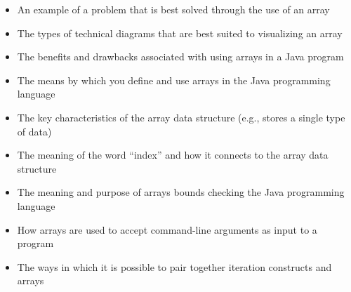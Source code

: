 \begin{itemize}

  \itemsep -.015in
  \item An example of a problem that is best solved through the use of an array
  \item The types of technical diagrams that are best suited to visualizing an array
  \item The benefits and drawbacks associated with using arrays in a Java program
  \item The means by which you define and use arrays in the Java programming language
  \item The key characteristics of the array data structure (e.g., stores a single type of data)
  \item The meaning of the word ``index'' and how it connects to the array data structure
  \item The meaning and purpose of arrays bounds checking the Java programming language
  \item How arrays are used to accept command-line arguments as input to a program
  \item The ways in which it is possible to pair together iteration constructs and arrays

\end{itemize}





